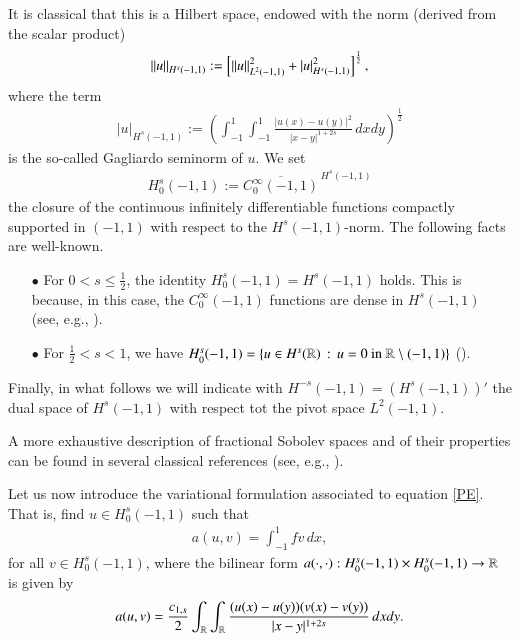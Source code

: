 It is classical that this is a Hilbert space, endowed with the norm (derived from the scalar product)
\begin{align*}
	{\left\|u\right\|}_{H^s(-1,1)} := \left[{\left\|u\right\|}_{L^2(-1,1)}^2 + |u|_{H^s(-1,1)}^2\right]^{\frac 12},
\end{align*}
where the term 
\begin{align*}
	|u|_{H^s(-1,1)}:= \left(\int_{-1}^1\int_{-1}^1 \frac{|u(x)-u(y)|^2}{|x-y|^{1+2s}}\,dxdy\right)^{\frac 12}
\end{align*}
is the so-called Gagliardo seminorm of $u$. We set 
\begin{align*}
H_0^s(-1,1):= \overline{C_0^\infty(-1,1)}^{\,H^s(-1,1)}
\end{align*}
the closure of the continuous infinitely differentiable functions compactly supported in $(-1,1)$ with respect to the $H^s(-1,1)$-norm. The following facts are well-known.
\begin{itemize}
	\item[$\bullet$] For $0<s\leq\frac 12$, the identity $H_0^s(-1,1) = H^s(-1,1)$ holds. This is because, in this case, the $C_0^\infty(-1,1)$ functions are dense in $H^s(-1,1)$ (see, e.g., \cite[Theorem 11.1]{jllions1972non}).
	
	\item[$\bullet$] For $\frac 12<s<1$, we have $H_0^s(-1,1)=\left\{ u\in H^s(\mathbb{R})\,:\,u=0\textrm{ in } \mathbb{R}\setminus (-1,1)\right\}$ (\cite{fiscella2015density}).
\end{itemize}

Finally, in what follows we will indicate with $H^{-s}(-1,1)=\left(H^s(-1,1)\right)'$ the dual space of $H^s(-1,1)$ with respect tot the pivot space $L^2(-1,1)$.

A more exhaustive description of fractional Sobolev spaces and of their properties can be found in several classical references (see, e.g., \cite{adams2003sobolev,dihitchhiker,jllions1972non}).

Let us now introduce the variational formulation associated to equation \eqref{PE}. That is, find $u\in H^s_0(-1,1)$ such that
\begin{align*}
	a(u,v) = \int_{-1}^1 fv\,dx,	
\end{align*}
for all $v\in H_0^s(-1,1)$, where the bilinear form $a(\cdot,\cdot):H^s_0(-1,1)\times H^s_0(-1,1)\to \mathbb{R}$ is given by
\begin{align}\label{bilinear}
	a(u,v)=\frac{c_{1,s}}{2} \int_{\mathbb{R}}\int_{\mathbb{R}}\frac{(u(x)-u(y))(v(x)-v(y))}{|x-y|^{1+2s}}\,dxdy.	
\end{align}

